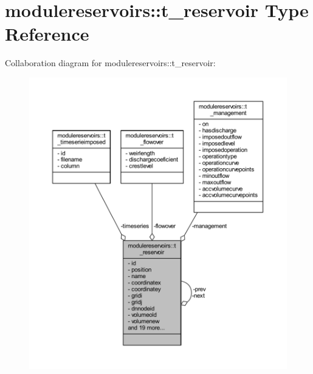 \hypertarget{structmodulereservoirs_1_1t__reservoir}{}\section{modulereservoirs\+:\+:t\+\_\+reservoir Type Reference}
\label{structmodulereservoirs_1_1t__reservoir}


Collaboration diagram for modulereservoirs\+:\+:t\+\_\+reservoir\+:\nopagebreak
\begin{figure}[H]
\begin{center}
\leavevmode
\includegraphics[width=350pt]{structmodulereservoirs_1_1t__reservoir__coll__graph}
\end{center}
\end{figure}
